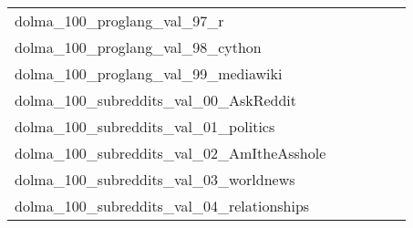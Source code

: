 {\begin{longtable}{m{6cm}m{1.7cm}m{1.7cm}m{1.7cm}m{1.7cm}m{1.7cm}}
	dolma\_100\_proglang\_val\_97\_r  & \colorbox[HTML]{77c578}{\makebox[\mywidth][c]{2.80}} & \colorbox[HTML]{def2a6}{\makebox[\mywidth][c]{2.92}} & \colorbox[HTML]{ffffe5}{\makebox[\mywidth][c]{3.66}} & \colorbox[HTML]{b8e293}{\makebox[\mywidth][c]{2.86}} & \colorbox[HTML]{89cd7f}{\makebox[\mywidth][c]{2.81}}\\
	dolma\_100\_proglang\_val\_98\_cython  & \colorbox[HTML]{77c578}{\makebox[\mywidth][c]{2.34}} & \colorbox[HTML]{def2a6}{\makebox[\mywidth][c]{2.39}} & \colorbox[HTML]{ffffe5}{\makebox[\mywidth][c]{2.69}} & \colorbox[HTML]{b6e092}{\makebox[\mywidth][c]{2.36}} & \colorbox[HTML]{8ccf81}{\makebox[\mywidth][c]{2.35}}\\
	dolma\_100\_proglang\_val\_99\_mediawiki  & \colorbox[HTML]{77c578}{\makebox[\mywidth][c]{2.01}} & \colorbox[HTML]{eaf7af}{\makebox[\mywidth][c]{2.10}} & \colorbox[HTML]{ffffe5}{\makebox[\mywidth][c]{2.48}} & \colorbox[HTML]{f6fbb8}{\makebox[\mywidth][c]{2.12}} & \colorbox[HTML]{b2df90}{\makebox[\mywidth][c]{2.04}}\\
	dolma\_100\_subreddits\_val\_00\_AskReddit  & \colorbox[HTML]{ffffe5}{\makebox[\mywidth][c]{20.25}} & \colorbox[HTML]{d5eea1}{\makebox[\mywidth][c]{19.29}} & \colorbox[HTML]{ffffe5}{\makebox[\mywidth][c]{20.38}} & \colorbox[HTML]{d4eea0}{\makebox[\mywidth][c]{19.28}} & \colorbox[HTML]{77c578}{\makebox[\mywidth][c]{19.14}}\\
	dolma\_100\_subreddits\_val\_01\_politics  & \colorbox[HTML]{ffffe5}{\makebox[\mywidth][c]{22.08}} & \colorbox[HTML]{addd8e}{\makebox[\mywidth][c]{20.70}} & \colorbox[HTML]{ffffe5}{\makebox[\mywidth][c]{22.07}} & \colorbox[HTML]{def2a6}{\makebox[\mywidth][c]{20.83}} & \colorbox[HTML]{77c578}{\makebox[\mywidth][c]{20.61}}\\
	dolma\_100\_subreddits\_val\_02\_AmItheAsshole  & \colorbox[HTML]{ffffe5}{\makebox[\mywidth][c]{22.49}} & \colorbox[HTML]{8bce80}{\makebox[\mywidth][c]{21.30}} & \colorbox[HTML]{ffffe5}{\makebox[\mywidth][c]{22.89}} & \colorbox[HTML]{eef8b2}{\makebox[\mywidth][c]{21.60}} & \colorbox[HTML]{77c578}{\makebox[\mywidth][c]{21.27}}\\
	dolma\_100\_subreddits\_val\_03\_worldnews  & \colorbox[HTML]{ffffe5}{\makebox[\mywidth][c]{22.57}} & \colorbox[HTML]{d8efa2}{\makebox[\mywidth][c]{21.43}} & \colorbox[HTML]{ffffe5}{\makebox[\mywidth][c]{22.77}} & \colorbox[HTML]{e7f5ad}{\makebox[\mywidth][c]{21.50}} & \colorbox[HTML]{77c578}{\makebox[\mywidth][c]{21.23}}\\
	dolma\_100\_subreddits\_val\_04\_relationships  & \colorbox[HTML]{ffffe5}{\makebox[\mywidth][c]{18.64}} & \colorbox[HTML]{cae99c}{\makebox[\mywidth][c]{17.80}} & \colorbox[HTML]{ffffe5}{\makebox[\mywidth][c]{18.89}} & \colorbox[HTML]{e1f3a9}{\makebox[\mywidth][c]{17.86}} & \colorbox[HTML]{77c578}{\makebox[\mywidth][c]{17.67}}\\

\end{longtable}}
